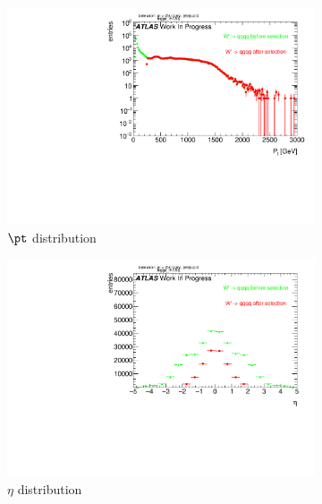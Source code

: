 \begin{figure}
    \centering
    \begin{subfigure}[b]{0.45\textwidth}
        \includegraphics[width=\textwidth]{jet_part/appendixA/higgs/1cfrt_h_FatJet_pt.pdf}
        \caption{$\pt$ distribution}
        \label{fig:gull}
    \end{subfigure}
    \begin{subfigure}[b]{0.45\textwidth}
        \includegraphics[width=\textwidth]{jet_part/appendixA/higgs/1cfrt_h_FatJet_eta.pdf}
        \caption{$\eta$ distribution}
        \label{fig:tiger}
    \end{subfigure}
    \begin{subfigure}[b]{0.45\textwidth}

\end{subfigure}
\end{figure}
